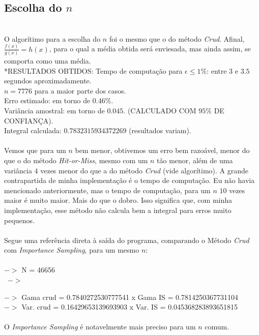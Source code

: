 \documentclass[pt12]{article}
\begin{document}
\subsection{Escolha do $n$}
\ \\

O algorítimo para a escolha do $n$ foi o mesmo que o do método \textit{Crud}. Afinal, $\frac{f(x)}{g(x)}=h(x)$, para o qual a média obtida será enviesada, mas ainda assim, se comporta como uma média.
\ \\

*RESULTADOS OBTIDOS:
Tempo de computação para $\epsilon \leq 1\%$: entre $3$ e $3.5$ segundos aproximadamente. \\
$n = 7776$ para a maior parte dos casos. \\
Erro estimado: em torno de $0.46\%$.\\
Variância amostral: em torno de $0.045$. (CALCULADO COM $95\%$ DE CONFIANÇA).\\
Integral calculada: $0.7832315934372269$ (resultados variam).\\
\ \\

Vemos que para um $n$ bem menor, obtivemos um erro bem razoável, menor do que o do método \textit{Hit-or-Miss}, mesmo com um $n$ tão menor, além de uma variância $4$ vezes menor do que a do método \textit{Crud} (vide algorítimo). A grande contrapartida de minha implementação é o tempo de computação. Eu não havia mencionado anteriormente, mas o tempo de computação, para um $n$ $10$ vezes maior é muito maior. Mais do que o dobro. Isso significa que, com minha implementação, esse método não calcula bem a integral para erros muito pequenos.\\
\ \\
Segue uma referência direta à saída do programa, comparando o Método \textit{Crud} com \textit{Importance Sampling}, para um mesmo $n$:\\
\ \\

\noindent $->$ N =  46656\\
\ $->$

\noindent $->$ Gama crud =  0.7840272530777541 x Gama IS =  0.7814250367731104\\
$->$ Var. crud =  0.16429653139693903 x Var. IS =  0.045368283893651815\\
\ \\

O \textit{Importance Sampling} é notavelmente mais preciso para um $n$ comum.
\end{document}
